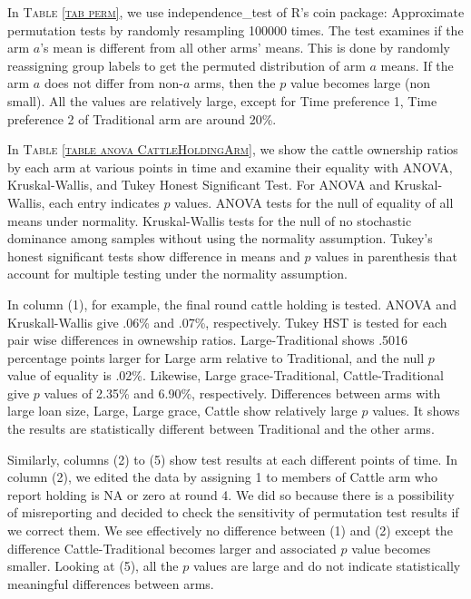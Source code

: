 In \textsc{\normalsize Table \ref{tab perm}}, we use \textsf{independence\_test} of \textsf{R}'s \textsf{coin} package: Approximate permutation tests by randomly resampling 100000 times. The test examines if the arm $a$'s mean is different from all other arms' means. This is done by randomly reassigning group labels to get the permuted distribution of arm $a$ means. If the arm $a$ does not differ from non-$a$ arms, then the $p$ value becomes large (non small). All the values are relatively large, except for \textsf{Time preference 1, Time preference 2} of \textsf{Traditional} arm are around 20\%.

In \textsc{\normalsize Table \ref{table anova CattleHoldingArm}}, we show the cattle ownership ratios by each arm  at various points in time and examine their equality with ANOVA, Kruskal-Wallis, and Tukey Honest Significant Test. For ANOVA and Kruskal-Wallis, each entry indicates $p$ values. ANOVA tests for the null of equality of all means under normality. Kruskal-Wallis tests for the null of no stochastic dominance among samples without using the normality assumption. Tukey's honest significant tests show difference in means and $p$ values in parenthesis that account for multiple testing under the normality assumption.  

In column (1), for example, the final round cattle holding is tested. ANOVA and Kruskall-Wallis give .06\% and .07\%, respectively. Tukey HST is tested for each pair wise differences in ownewship ratios. \textsf{Large-Traditional} shows .5016 percentage points larger for \textsf{Large} arm relative to \textsf{Traditional}, and the null $p$ value of equality is .02\%. Likewise, \textsf{Large grace-Traditional, Cattle-Traditional} give $p$ values of 2.35\% and 6.90\%, respectively. Differences between arms with large loan size, \textsf{Large, Large grace, Cattle} show relatively large $p$ values. It shows the results are statistically different between \textsf{Traditional} and the other arms. 

Similarly, columns (2) to (5) show test results at each different points of time. In column (2), we edited the data by assigning 1 to members of \textsf{Cattle} arm who report holding is NA or zero at round 4. We did so because there is a possibility of misreporting and decided to check the sensitivity of permutation test results if we correct them. We see effectively no difference between (1) and (2) except the difference \textsf{Cattle-Traditional} becomes larger and associated $p$ value becomes smaller. Looking at (5), all the $p$ values are large and do not indicate statistically meaningful differences between arms.


